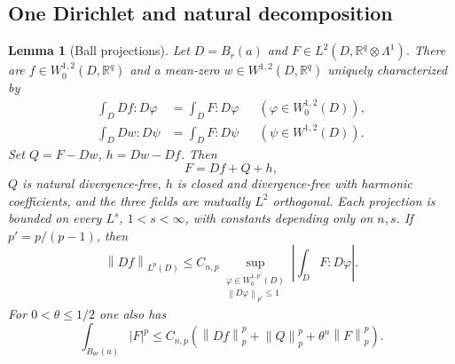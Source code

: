 \documentclass[11pt,a4paper]{article}
\numberwithin{equation}{section}
\newtheorem{lemma}[theorem]{Lemma}
\theoremstyle{definition}
\theoremstyle{remark}
\newcommand{\R}{\mathbb R}
\newcommand{\norm}[1]{\left\lVert#1\right\rVert}
\begin{document}
\subsection{One Dirichlet and natural decomposition}\label{sec:projection}
\begin{lemma}[Ball projections]\label{lem:projection}
Let $D=B_r(a)$ and $F\in L^2(D,\R^q\otimes\Lambda^1)$. There are
$f\in W^{1,2}_0(D,\R^q)$ and a mean-zero $w\in W^{1,2}(D,\R^q)$
uniquely characterized by
\begin{align}
 \int_D Df:D\varphi&=\int_D F:D\varphi
                &&(\varphi\in W^{1,2}_0(D)),\label{eq:dir-proj}\\
 \int_D Dw:D\psi&=\int_D F:D\psi
                &&(\psi\in W^{1,2}(D)).\label{eq:neu-proj}
\end{align}
Set $Q=F-Dw$, $h=Dw-Df$. Then
\begin{equation}\label{eq:decomposition}
 F=Df+Q+h,
\end{equation}
$Q$ is natural divergence-free, $h$ is closed and divergence-free with
harmonic coefficients, and the three fields are mutually $L^2$ orthogonal.
Each projection is bounded on every $L^s$, $1<s<\infty$, with constants
depending only on $n,s$. If $p'=p/(p-1)$, then
\begin{equation}\label{eq:dirichlet-duality}
 \norm{Df}_{L^p(D)}\leq C_{n,p}
 \sup_{\substack{\varphi\in W^{1,p'}_0(D)\\\norm{D\varphi}_{p'}\leq1}}
       \left|\int_D F:D\varphi\right|.
\end{equation}
For $0<\theta\leq1/2$ one also has
\begin{equation}\label{eq:projection-small-ball}
 \int_{B_{\theta r}(a)}|F|^p
 \leq C_{n,p}\left(\norm{Df}_p^p+\norm Q_p^p
                    +\theta^n\norm F_p^p\right).
\end{equation}
\end{lemma}
\end{document}
